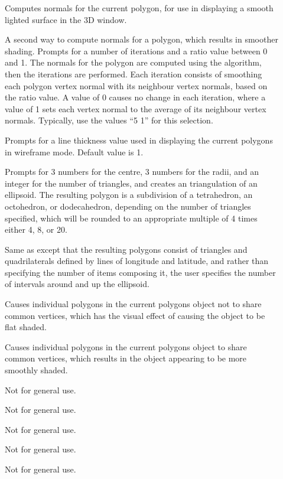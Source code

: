 \begin{description}
\item[]  Computes normals for the
     current polygon, for use in displaying a smooth lighted surface in
     the 3D window. 
\item[]  A second way to compute
     normals for a polygon, which results in smoother shading.
     Prompts for a number of
     iterations and a ratio value between 0 and 1.  The normals for the
     polygon are computed using the 
     algorithm, then the iterations are performed.  Each
     iteration consists of smoothing each polygon vertex normal with
     its neighbour vertex normals, based on the ratio value.  A value
     of 0 causes no change in each iteration, where a value of 1
     sets each vertex normal to the average of its neighbour vertex
     normals.  Typically, use the values ``5 1'' for this selection.
\item[]  Prompts for a line thickness
     value used in displaying the current polygons in wireframe mode.
     Default value is 1.
\item[]  Prompts for 3 numbers
     for the centre, 3 numbers for the radii, and an integer for the number
     of triangles, and creates an triangulation of an ellipsoid.  The
     resulting polygon is a subdivision of a tetrahedron, an octohedron,
     or dodecahedron, depending on the number of triangles specified, which
     will be rounded to an appropriate multiple of 4 times either 4, 8, or 20.
\item[]  Same as
      except that the resulting
     polygons consist of triangles and quadrilaterals defined by lines of
     longitude and latitude, and rather than specifying the number of items
     composing it, the user specifies the number of intervals around and up
     the ellipsoid.
\item[]  Causes individual polygons in
     the current polygons object not to share common vertices, which has
     the visual effect of causing the object to be flat shaded.
\item[]  Causes individual polygons in
     the current polygons object to share common vertices, which results in
     the object appearing to be more smoothly shaded.
\item[]  Not for general use.
\item[]  Not for general use.
\item[]  Not for general use.
\item[]  Not for general use.
\item[]  Not for general use.
\end{description}

